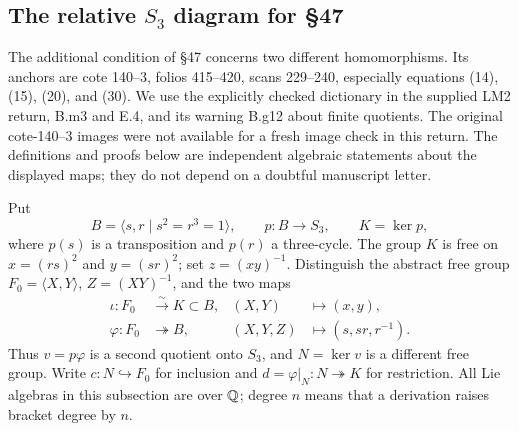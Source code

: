 \subsection{The relative $S_3$ diagram for \S47}

The additional condition of \S47 concerns two different homomorphisms.
Its anchors are cote 140--3, folios 415--420, scans 229--240, especially
equations (14), (15), (20), and (30). We use the explicitly checked
dictionary in the supplied LM2 return, B.m3 and E.4, and its warning
B.g12 about finite quotients. The original cote-140--3 images were not
available for a fresh image check in this return. The definitions and
proofs below are independent algebraic statements about the displayed
maps; they do not depend on a doubtful manuscript letter.

Put
\[
 B=\langle s,r\mid s^2=r^3=1\rangle,
 \qquad p:B\longrightarrow S_3,
 \qquad K=\ker p,
\]
where $p(s)$ is a transposition and $p(r)$ a three-cycle. The group $K$
is free on $x=(rs)^2$ and $y=(sr)^2$; set $z=(xy)^{-1}$. Distinguish
the abstract free group $F_0=\langle X,Y\rangle$, $Z=(XY)^{-1}$, and
the two maps
\[
 \begin{aligned}
 \iota:F_0&\stackrel{\sim}{\longrightarrow}K\subset B,
      &(X,Y)&\longmapsto(x,y),\\
 \varphi:F_0&\twoheadrightarrow B,
      &(X,Y,Z)&\longmapsto(s,sr,r^{-1}).
 \end{aligned}
\]
Thus $v=p\varphi$ is a second quotient onto $S_3$, and
$N=\ker v$ is a different free group. Write $c:N\hookrightarrow F_0$
for inclusion and $d=\varphi|_N:N\twoheadrightarrow K$ for restriction.
All Lie algebras in this subsection are over $\mathbb Q$; degree $n$ means
that a derivation raises bracket degree by $n$.

